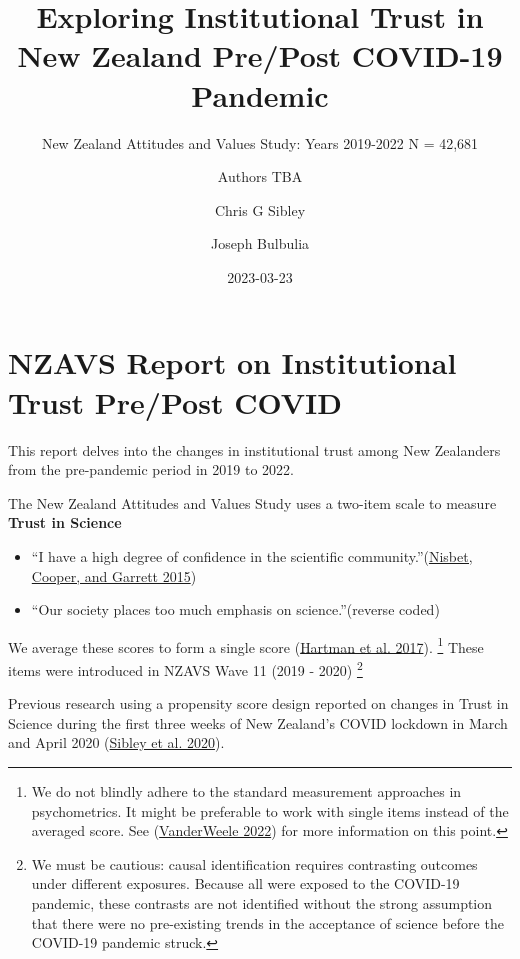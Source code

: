 \documentclass[
  singlecolumn]{report}
\title{Exploring Institutional Trust in New Zealand Pre/Post COVID-19
Pandemic}
\subtitle{New Zealand Attitudes and Values Study: Years 2019-2022 N =
42,681}
\author{Authors TBA \and Chris G Sibley \and Joseph Bulbulia}
\date{2023-03-23}
\begin{document}
\maketitle
\ifdefined\Shaded\renewenvironment{Shaded}{\begin{tcolorbox}[boxrule=0pt, borderline west={3pt}{0pt}{shadecolor}, breakable, enhanced, sharp corners, interior hidden, frame hidden]}{\end{tcolorbox}}\fi

\listoffigures
\listoftables
\hypertarget{nzavs-report-on-institutional-trust-prepost-covid}{%
\section{NZAVS Report on Institutional Trust Pre/Post
COVID}\label{nzavs-report-on-institutional-trust-prepost-covid}}

This report delves into the changes in institutional trust among New
Zealanders from the pre-pandemic period in 2019 to 2022.

The New Zealand Attitudes and Values Study uses a two-item scale to
measure \textbf{Trust in Science}

\begin{itemize}
\item
  ``I have a high degree of confidence in the scientific
  community.''(\protect\hyperlink{ref-nisbet2015}{Nisbet, Cooper, and
  Garrett 2015})
\item
  ``Our society places too much emphasis on science.''(reverse coded)
\end{itemize}

We average these scores to form a single score
(\protect\hyperlink{ref-hartman2017}{Hartman et al. 2017}). \footnote{We
  do not blindly adhere to the standard measurement approaches in
  psychometrics. It might be preferable to work with single items
  instead of the averaged score. See
  (\protect\hyperlink{ref-vanderweele2022}{VanderWeele 2022}) for more
  information on this point.} These items were introduced in NZAVS Wave
11 (2019 - 2020) \footnote{We must be cautious: causal identification
  requires contrasting outcomes under different exposures. Because all
  were exposed to the COVID-19 pandemic, these contrasts are not
  identified without the strong assumption that there were no
  pre-existing trends in the acceptance of science before the COVID-19
  pandemic struck.}

Previous research using a propensity score design reported on changes in
Trust in Science during the first three weeks of New Zealand's COVID
lockdown in March and April 2020
(\protect\hyperlink{ref-sibley2020}{Sibley et al. 2020}).
\end{document}
